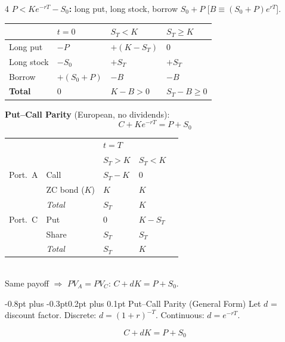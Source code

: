 \documentclass[6.5pt,landscape,a4paper]{extarticle}
\makeatletter
\renewcommand{\subsection}{\@startsection{subsection}{2}{0mm}%
  {-0.8pt plus -0.3pt}{0.2pt plus 0.1pt}%
  {\normalfont\bfseries\footnotesize\color{sub}}}
\makeatother
\begin{document}
\begin{multicols*}{4}
  \textbf{$P<Ke^{-rT}-S_0$:} long put, long stock, borrow $S_0+P$ [$B\equiv(S_0{+}P)e^{rT}$].\\
  {\tiny\begin{tabular}{@{}llll@{}}
    \toprule
                   & $t{=}0$      & $S_T{<}K$    & $S_T{\ge}K$ \\
    \midrule
    Long put       & $-P$         & $+(K{-}S_T)$ & $0$         \\
    Long stock     & $-S_0$       & $+S_T$       & $+S_T$      \\
    Borrow         & $+(S_0{+}P)$ & $-B$         & $-B$        \\
    \midrule
    \textbf{Total} & $0$          & $K-B>0$      & $S_T-B\ge0$ \\
    \bottomrule
  \end{tabular}}

  \begin{kbox}
    \textbf{Put--Call Parity} (European, no dividends):
    \[C + Ke^{-rT} = P + S_0\]
    {\tiny\begin{tabular}{@{}lllll@{}}
      \toprule
               &                & $t{=}T$   &           \\
               &                & $S_T{>}K$ & $S_T{<}K$ \\
      \midrule
      Port.\ A & Call           & $S_T-K$   & $0$       \\
               & ZC bond ($K$)  & $K$       & $K$       \\
               & \textit{Total} & $S_T$     & $K$       \\
      \midrule
      Port.\ C & Put            & $0$       & $K-S_T$   \\
               & Share          & $S_T$     & $S_T$     \\
               & \textit{Total} & $S_T$     & $K$       \\
      \bottomrule
    \end{tabular}}\\
    Same payoff $\Rightarrow$ $PV_A=PV_C$: $C+dK=P+S_0$.
  \end{kbox}

  \subsection{Put--Call Parity (General Form)}
  Let $d$ = discount factor. Discrete: $d=(1+r)^{-T}$. Continuous: $d=e^{-rT}$.
  \begin{kbox}
    \[C + dK = P + S_0\]
  \end{kbox}


\end{multicols*}
\end{document}
